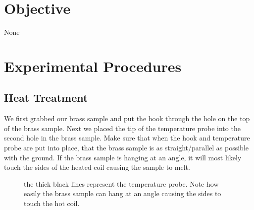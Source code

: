 \documentclass{article}
\begin{document}



\section{Objective}

None


\section{Experimental Procedures}
\subsection{Heat Treatment}
We first grabbed our brass sample and put the hook through the hole on the top of the brass sample. Next we placed the tip of the temperature probe into the second hole in the brass sample. Make sure that when the hook and temperature probe are put into place, that the brass sample is as straight/parallel as possible with the ground. If the brass sample is hanging at an angle, it will most likely touch the sides of the heated coil causing the sample to melt.
\begin{figure}[H]
\centering
{}
\caption{the thick black lines represent the temperature probe. Note how easily the brass sample can hang at an angle causing the sides to touch the hot coil.}
\end{figure}
\end{document}
